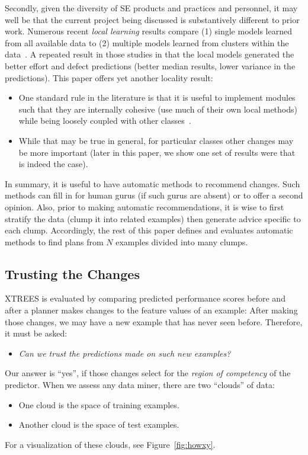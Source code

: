 \documentclass{sig-alternate}
\newcommand{\bi}{\begin{itemize}}
\newcommand{\ei}{\end{itemize}}
\newcommand{\fig}[1]{Figure~\ref{fig:#1}}
\begin{document}
Secondly, given the diversity of SE products and practices
and personnel, it may well be that the current project being discussed is 
substantively different to prior work. 
Numerous recent {\em local learning} results compare (1) single models
learned from all available data to (2) multiple models learned from clusters within the data~\cite{betten14,yang11,yang13,minku13,me12d,me11m,posnett11}.
A repeated result in those studies in that the local models generated the better effort
and defect predictions (better median results,
lower variance in the predictions). This paper offers yet another locality result:
\bi
\item
One standard rule in the literature
is that it is useful to implement modules such that they are internally cohesive (use
much of their own local methods) while being loosely coupled with other classes~\cite{Dhama199565}.
\item
While that may be true in general, for particular classes other changes may be more important
(later in this paper, we show one set of results were that is indeed the case).
\ei
In summary, 
it is useful to have automatic methods to recommend changes. Such
methods can fill in for human gurus (if such gurus are absent) or 
to offer a second opinion.
Also, prior to making automatic recommendations, it is wise to first stratify the data
(clump it into related examples) then generate advice specific to each clump.
Accordingly, the rest of this paper defines and evaluates
automatic methods to find plans from
  $N$ examples divided  into  many clumps.





\subsection{Trusting the Changes}\label{sect:trust}
   XTREES is evaluated by  comparing
predicted performance scores before and after a planner makes changes to the feature values of an example:
After making those
changes, we may have a new example that has never seen before. Therefore, it must be asked:
\bi
\item
{\em Can we trust the predictions made on such new examples?}
\ei
Our answer is ``yes'', if those changes select for the {\em region of competency} of the predictor. When we assess
any data miner, there are two ``clouds'' of data:
\bi
\item One cloud is the space of training examples.
\item Another cloud is the space of test examples.
\ei
For a visualization of these clouds, see \fig{howxy}.
\end{document}
